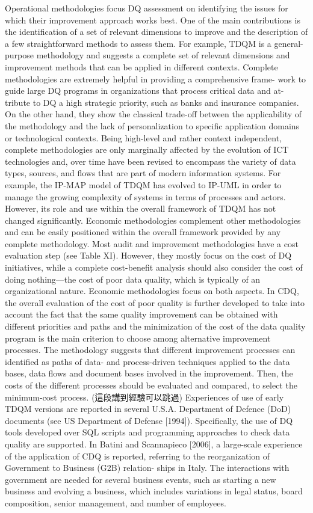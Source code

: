 \documentclass[pdftex,english,oribibl]{llncs}
\begin{document}
    Operational methodologies focus DQ assessment on identifying the issues for which their improvement approach works best. One of the main contributions is the identification of a set of relevant dimensions to improve and the description of a few straightforward methods to assess them. For example, TDQM is a general-purpose methodology and suggests a complete set of relevant dimensions and improvement methods that can be applied in different contexts.
    Complete methodologies are extremely helpful in providing a comprehensive frame- work to guide large DQ programs in organizations that process critical data and at- tribute to DQ a high strategic priority, such as banks and insurance companies. On the other hand, they show the classical trade-off between the applicability of the methodology and the lack of personalization to specific application domains or technological contexts. Being high-level and rather context independent, complete methodologies are only marginally affected by the evolution of ICT technologies and, over time have been revised to encompass the variety of data types, sources, and flows that are part of modern information systems. For example, the IP-MAP model of TDQM has evolved to IP-UML in order to manage the growing complexity of systems in terms of processes and actors. However, its role and use within the overall framework of TDQM has not changed significantly.
    Economic methodologies complement other methodologies and can be easily positioned within the overall framework provided by any complete methodology. Most audit and improvement methodologies have a cost evaluation step (see Table XI). However, they mostly focus on the cost of DQ initiatives, while a complete cost-benefit analysis should also consider the cost of doing nothing—the cost of poor data quality, which is typically of an organizational nature. Economic methodologies focus on both aspects.
    In CDQ, the overall evaluation of the cost of poor quality is further developed to take into account the fact that the same quality improvement can be obtained with different priorities and paths and the minimization of the cost of the data quality program is the main criterion to choose among alternative improvement
    processes. The methodology suggests that different improvement processes can identified as paths of data- and process-driven techniques applied to the data bases, data flows and document bases involved in the improvement. Then, the costs of the different processes should be evaluated and compared, to select the minimum-cost process.
    (這段講到經驗可以跳過)
    Experiences of use of early TDQM versions are reported in several U.S.A. Department of Defence (DoD) documents (see US Department of Defense [1994]). Specifically, the use of DQ tools developed over SQL scripts and programming approaches to check data quality are supported.
    In Batini and Scannapieco [2006], a large-scale experience of the application of CDQ is reported, referring to the reorganization of Government to Business (G2B) relation- ships in Italy. The interactions with government are needed for several business events, such as starting a new business and evolving a business, which includes variations in legal status, board composition, senior management, and number of employees.
\end{document}
